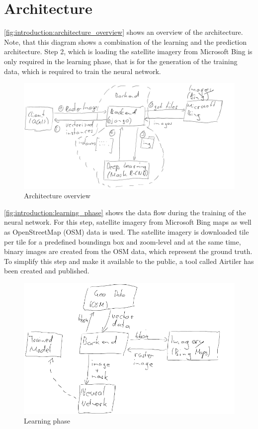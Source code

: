 \section{Architecture}
\autoref{fig:introduction:architecture_overview} shows an overview of the architecture. Note, that this diagram shows a combination of the learning and the prediction architecture. Step 2, which is loading the satellite imagery from Microsoft Bing is only required in the learning phase, that is for the generation of the training data, which is required to train the neural network.

\begin{figure}[H]
    \centering
	\includegraphics[width=0.9\linewidth]{chapters/introduction/images/overview.png}
	\caption{Architecture overview}
	\label{fig:introduction:architecture_overview}
\end{figure}

\autoref{fig:introduction:learning_phase} shows the data flow during the training of the neural network. For this step, satellite imagery from Microsoft Bing maps as well as OpenStreetMap (OSM) data is used. The satellite imagery is downloaded tile per tile for a predefined boundingn box and zoom-level and at the same time, binary images are created from the OSM data, which represent the ground truth. To simplify this step and make it available to the public, a tool called Airtiler \cite{airtiler} has been created and published.

\begin{figure}[H]
    \centering
	\includegraphics[width=0.9\linewidth]{chapters/introduction/images/learning_phase.png}
	\caption{Learning phase}
	\label{fig:introduction:learning_phase}
\end{figure}

